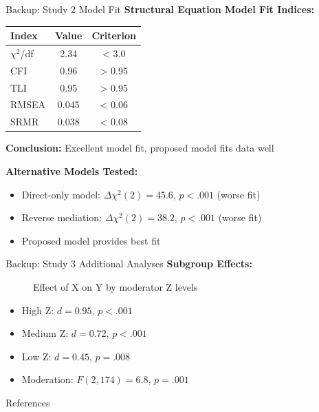 \documentclass[aspectratio=169,12pt]{beamer}
\begin{document}
\begin{frame}{Backup: Study 2 Model Fit}
  \textbf{Structural Equation Model Fit Indices:}

  \begin{table}
    \centering
    \begin{tabular}{lcc}
      \toprule
      \textbf{Index} & \textbf{Value} & \textbf{Criterion} \\
      \midrule
      $\chi^2$/df & 2.34 & < 3.0 \\
      CFI & 0.96 & > 0.95 \\
      TLI & 0.95 & > 0.95 \\
      RMSEA & 0.045 & < 0.06 \\
      SRMR & 0.038 & < 0.08 \\
      \bottomrule
    \end{tabular}
  \end{table}

  \vspace{0.5cm}

  \textbf{Conclusion:} Excellent model fit, proposed model fits data well

  \vspace{0.5cm}

  \textbf{Alternative Models Tested:}
  \begin{itemize}
    \item Direct-only model: $\Delta\chi^2(2) = 45.6$, $p < .001$ (worse fit)
    \item Reverse mediation: $\Delta\chi^2(2) = 38.2$, $p < .001$ (worse fit)
    \item Proposed model provides best fit
  \end{itemize}
\end{frame}

\begin{frame}{Backup: Study 3 Additional Analyses}
  \textbf{Subgroup Effects:}

  \begin{figure}
    \centering
    \caption{Effect of X on Y by moderator Z levels}
  \end{figure}

  \begin{itemize}
    \item High Z: $d = 0.95$, $p < .001$
    \item Medium Z: $d = 0.72$, $p < .001$
    \item Low Z: $d = 0.45$, $p = .008$
    \item Moderation: $F(2,174) = 6.8$, $p = .001$
  \end{itemize}
\end{frame}


\begin{frame}[allowframebreaks]{References}
  \printbibliography
\end{frame}
\end{document}
